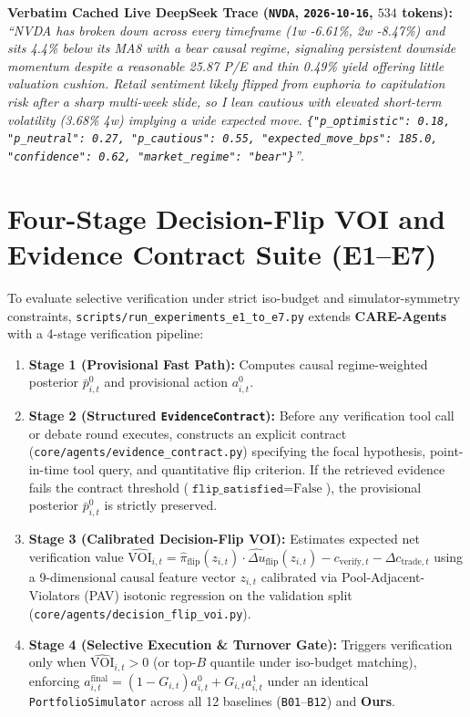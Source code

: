 \documentclass[10pt,a4paper,twocolumn]{article}
\begin{document}
\noindent\textbf{Verbatim Cached Live DeepSeek Trace (\texttt{NVDA}, \texttt{2026-10-16}, $534$ tokens):} \textit{``NVDA has broken down across every timeframe (1w -6.61\%, 2w -8.47\%) and sits 4.4\% below its MA8 with a bear causal regime, signaling persistent downside momentum despite a reasonable 25.87 P/E and thin 0.49\% yield offering little valuation cushion. Retail sentiment likely flipped from euphoria to capitulation risk after a sharp multi-week slide, so I lean cautious with elevated short-term volatility (3.68\% 4w) implying a wide expected move. \texttt{\{"p\_optimistic": 0.18, "p\_neutral": 0.27, "p\_cautious": 0.55, "expected\_move\_bps": 185.0, "confidence": 0.62, "market\_regime": "bear"\}}''}.

\section{Four-Stage Decision-Flip VOI and Evidence Contract Suite (E1--E7)}
\label{app:e1_e7_suite}

To evaluate selective verification under strict iso-budget and simulator-symmetry constraints, \texttt{scripts/run\_experiments\_e1\_to\_e7.py} extends \textbf{CARE-Agents} with a 4-stage verification pipeline:
\begin{enumerate}
  \setlength{\itemsep}{1pt}\setlength{\parskip}{0pt}
  \item \textbf{Stage 1 (Provisional Fast Path):} Computes causal regime-weighted posterior $\bar{p}_{i,t}^0$ and provisional action $a_{i,t}^0$.
  \item \textbf{Stage 2 (Structured \texttt{EvidenceContract}):} Before any verification tool call or debate round executes, constructs an explicit contract (\texttt{core/agents/evidence\_contract.py}) specifying the focal hypothesis, point-in-time tool query, and quantitative flip criterion. If the retrieved evidence fails the contract threshold ($\texttt{flip\_satisfied} = \text{False}$), the provisional posterior $\bar{p}_{i,t}^0$ is strictly preserved.
  \item \textbf{Stage 3 (Calibrated Decision-Flip VOI):} Estimates expected net verification value $\widehat{\text{VOI}}_{i,t} = \hat{\pi}_{\text{flip}}(z_{i,t}) \cdot \widehat{\Delta u}_{\text{flip}}(z_{i,t}) - c_{\text{verify}, t} - \Delta c_{\text{trade}, t}$ using a 9-dimensional causal feature vector $z_{i,t}$ calibrated via Pool-Adjacent-Violators (PAV) isotonic regression on the validation split (\texttt{core/agents/decision\_flip\_voi.py}).
  \item \textbf{Stage 4 (Selective Execution \& Turnover Gate):} Triggers verification only when $\widehat{\text{VOI}}_{i,t} > 0$ (or top-$B$ quantile under iso-budget matching), enforcing $a_{i,t}^{\text{final}} = (1 - G_{i,t}) a_{i,t}^0 + G_{i,t} a_{i,t}^1$ under an identical \texttt{PortfolioSimulator} across all 12 baselines (\texttt{B01}--\texttt{B12}) and \textbf{Ours}.
\end{enumerate}
\end{document}

